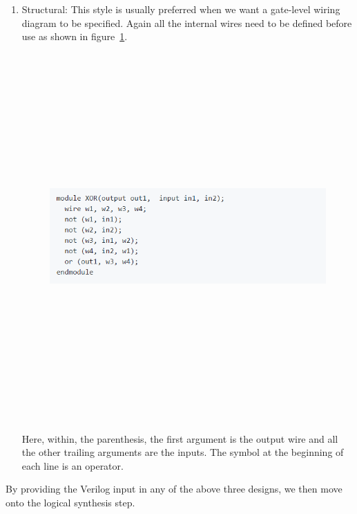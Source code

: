 \documentclass[11pt]{article}
\begin{document}
\begin{enumerate}
\item Structural: 
This style is usually preferred when we want a gate-level wiring diagram to be specified. Again all the internal wires need to be defined before use as shown in figure~\ref{Structural statements exmaple}.  
\begin{figure}[ht!]
\centering
\includegraphics[width=11cm,height=14cm,keepaspectratio]{structural.png}
\label{Structural statements exmaple}
\end{figure}

Here, within, the parenthesis, the first argument is the output wire and all the other trailing arguments are the inputs. The symbol at the beginning of each line is an operator.\\[\baselineskip]     
\bigskip
\bigskip
\bigskip
\bigskip
\end{enumerate}
By providing the Verilog input in any of the above three designs, we then move onto the logical synthesis step.
\end{document}
